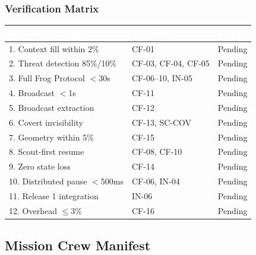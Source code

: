 \documentclass[11pt,letterpaper]{article}
\newcommand{\tableheader}[1]{\textbf{\sffamily\textcolor{white}{#1}}}
\begin{document}
\subsubsection{Verification Matrix}

\begin{center}
\begin{tabularx}{\textwidth}{XL{3.5cm}C{1.5cm}}
\toprule
{}
\tableheader{Success Criterion} & \tableheader{Test ID(s)} & \tableheader{Status} \\
. Context fill within 2\% & CF-01 & Pending \\
2. Threat detection 85\%/10\% & CF-03, CF-04, CF-05 & Pending \\
3. Full Frog Protocol $<$30s & CF-06--10, IN-05 & Pending \\
4. Broadcast $<$1s & CF-11 & Pending \\
5. Broadcast extraction & CF-12 & Pending \\
6. Covert invisibility & CF-13, SC-COV & Pending \\
7. Geometry within 5\% & CF-15 & Pending \\
8. Scout-first resume & CF-08, CF-10 & Pending \\
9. Zero state loss & CF-14 & Pending \\
10. Distributed pause $<$500ms & CF-06, IN-04 & Pending \\
11. Release 1 integration & IN-06 & Pending \\
12. Overhead $\leq$3\% & CF-16 & Pending \\
\bottomrule
\end{tabularx}
\end{center}

\subsection{Mission Crew Manifest}
\end{document}
